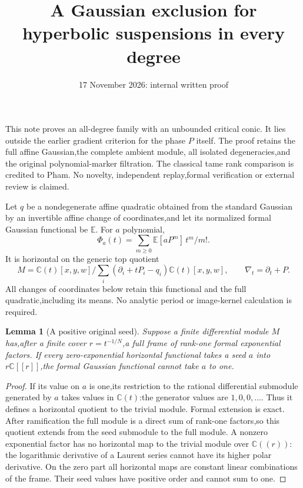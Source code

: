 \documentclass[11pt]{article}
\title{A Gaussian exclusion for hyperbolic suspensions in every degree}
\author{}\date{17 November 2026: internal written proof}
\newtheorem{lemma}[theorem]{Lemma}
\theoremstyle{definition}\newtheorem{definition}[theorem]{Definition}
\theoremstyle{remark}\newtheorem{remark}[theorem]{Remark}
\begin{document}
\maketitle
This note proves an all-degree family with an unbounded critical conic.
It lies outside the earlier gradient criterion for the phase $P$ itself.
The proof retains the full affine Gaussian,the complete ambient module,
all isolated degeneracies,and the original polynomial-marker filtration.
The classical tame rank comparison is credited to Pham. No novelty,
independent replay,formal verification or external review is claimed.

Let $q$ be a nondegenerate affine quadratic obtained from the standard
Gaussian by an invertible affine change of coordinates,and let its
normalized formal Gaussian functional be $\mathbb E$. For $a$ polynomial,
\[
 \Phi_a(t)=\sum_{m\ge0}\mathbb E[aP^m]\,t^m/m!.
\]
It is horizontal on the generic top quotient
\[
 M=\mathbb C(t)[x,y,w]/\sum_i(\partial_i+tP_i-q_i)\mathbb C(t)[x,y,w],
 \qquad\nabla_t=\partial_t+P.
\]
All changes of coordinates below retain this functional and the full
quadratic,including its means. No analytic period or image-kernel
calculation is required.

\begin{lemma}[A positive original seed]\label{lem:positiveformal}
Suppose a finite differential module $M$ has,after a finite cover
$r=t^{-1/N}$,a full frame of rank-one formal exponential factors.
If every zero-exponential horizontal functional takes a seed $a$ into
$r\mathbb C[[r]]$,the formal Gaussian functional cannot take $a$ to one.
\end{lemma}
\begin{proof}
If its value on $a$ is one,its restriction to the rational differential
submodule generated by $a$ takes values in $\mathbb C(t)$:the generator
values are $1,0,0,\ldots$. Thus it defines a horizontal quotient to the
trivial module. Formal extension is exact. After ramification the full
module is a direct sum of rank-one factors,so this quotient extends from
the seed submodule to the full module. A nonzero exponential factor
has no horizontal map to the trivial module over $\mathbb C((r))$:
the logarithmic derivative of a Laurent series cannot have its higher
polar derivative. On the zero part all horizontal maps are constant
linear combinations of the frame. Their seed values have positive order
and cannot sum to one.
\end{proof}
\end{document}
